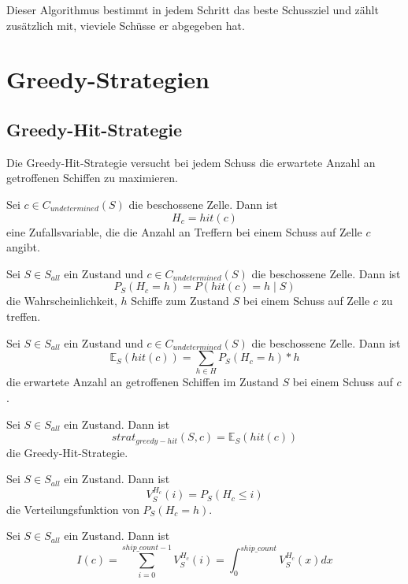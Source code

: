 \documentclass[a4paper,12pt]{llncs}
\numberwithin{equation}{section}
\begin{document}
Dieser Algorithmus bestimmt in jedem Schritt das beste Schussziel und zählt zusätzlich mit, vieviele Schüsse er abgegeben hat.

\section{Greedy-Strategien}

\subsection{Greedy-Hit-Strategie}
Die Greedy-Hit-Strategie versucht bei jedem Schuss die erwartete Anzahl an getroffenen Schiffen zu maximieren.

\begin{definition}
Sei $c \in C_{undetermined}(S)$ die beschossene Zelle.
Dann ist
\[
H_{c}=hit(c)
\]
eine Zufallsvariable, die die Anzahl an Treffern bei einem Schuss auf Zelle $c$ angibt.
\end{definition}

\begin{definition}
Sei $S\in S_{all}$ ein Zustand und $c \in C_{undetermined}(S)$ die beschossene Zelle.
Dann ist
\[
P_S(H_{c}=h)=P(hit(c)=h \mid S) 
\]
die Wahrscheinlichkeit, $h$ Schiffe zum Zustand $S$ bei einem Schuss auf Zelle $c$ zu treffen.
\end{definition}

\begin{definition}
Sei $S\in S_{all}$ ein Zustand und $c \in C_{undetermined}(S)$ die beschossene Zelle.
Dann ist
\[
\mathds{E}_S(hit(c))=\sum_{h \in H} P_S(H_{c}=h) * h
\]
die erwartete Anzahl an getroffenen Schiffen im Zustand $S$ bei einem Schuss auf $c$.
\end{definition}

\begin{definition}
Sei $S\in S_{all}$ ein Zustand.
Dann ist
\[
strat_{greedy-hit}(S,c)=\mathds{E}_S(hit(c))
\]
die Greedy-Hit-Strategie.
\end{definition}

\begin{definition}
Sei $S\in S_{all}$ ein Zustand.
Dann ist
\[
V_S^{H_{c}}(i)=P_S(H_{c} \leq i)
\]
die Verteilungsfunktion von $P_S(H_{c}=h)$.
\end{definition}

\begin{definition}
Sei $S\in S_{all}$ ein Zustand.
Dann ist
\[
I(c)=\sum_{i=0}^{ship\_count - 1} V_S^{H_{c}}(i)=\int_{0}^{ship\_count} V_S^{H_{c}}(x) dx
\]
\end{definition}
\end{document}
